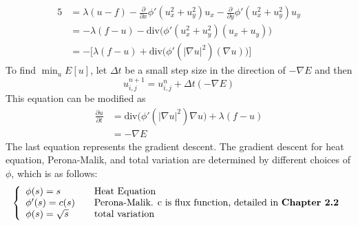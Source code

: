 \documentclass[12pt]{report}
\begin{document}
\begin{tableofcontents}
\begin{alignat*}{5}
	&= \lambda(u-f) - \frac{\partial}{\partial x}\phi'(u_{x}^2+u_{y}^2)u_{x}
    	- \frac{\partial}{\partial y}\phi'(u_{x}^2+u_{y}^2)u_{y} \\
	&= -\lambda(f-u) - \text{div}\Big(\phi'(u_{x}^2+u_{y}^2)(u_{x}+u_{y})\Big) \\
    &= -\Big[\lambda(f-u) + \text{div}\Big(\phi'(|\nabla u|^2)(\nabla u)\Big)\Big]
            \end{alignat*}
To find $\displaystyle\min_{u}E[u]$, let $\Delta t$ be a small step size in the direction of $-\nabla E$ and then
			\begin{equation}
u_{i,j}^{n+1} = u_{i,j}^{n} + \Delta t(-\nabla E)
			\end{equation}
This equation can be modified as
			\begin{equation}
            \begin{split}
\displaystyle\frac{\partial u}{\partial t}
		&= \text{div}\Big( \phi'(|\nabla u|^{2})\nabla u\Big) + \lambda (f-u)\\
		&= -\nabla E
        	\end{split}
			\end{equation}
The last equation represents the gradient descent. The gradient descent for heat equation, Perona-Malik, and total variation are determined by different choices of $\phi$, which is as follows:
\[ \left\{
  \begin{array}{l l}
    \phi(s)=s & \quad \text{Heat Equation}\\
    \phi'(s)=c(s) & \quad \text{Perona-Malik. c is flux function, detailed in \textbf{Chapter 2.2}} \\
    \phi(s)=\sqrt{s} & \quad \text{total variation}
  \end{array} \right.\]

\end{tableofcontents}
\end{document}
